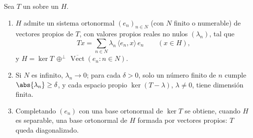 \begin{theorem}\label{thm:b3:spectral:spectral} Sea $T$ un
 sobre un
 $H$.
\begin{enumerate}
  \item $H$ admite un sistema ortonormal $(e_n)_{n \in N}$ (con $N$
  finito o numerable) de vectores propios de $T$, con valores propios
  reales no nulos $(\lambda_n)$, tal que
        \[
        Tx = \sum_{n\in N}\lambda_n\,\langle e_n, x\rangle\,
        e_n \qquad (x \in H),
        \]
        y $H = \ker T \,\oplus^\perp\,
        \overline{\operatorname{Vect}}(e_n : n \in N)$. \item Si $N$ es
        infinito, $\lambda_n \to 0$; para cada $\delta > 0$, solo un
        número finito de $n$ cumple $\abs{\lambda_n} \geq \delta$, y
        cada espacio propio $\ker(T - \lambda)$, $\lambda \neq 0$, tiene
        dimensión finita. \item Completando $(e_n)$ con una base
        ortonormal de $\ker T$ se obtiene, cuando $H$ es separable, una
        base ortonormal de $H$ formada por vectores propios: $T$ queda
        diagonalizado.
\end{enumerate}
\end{theorem}

